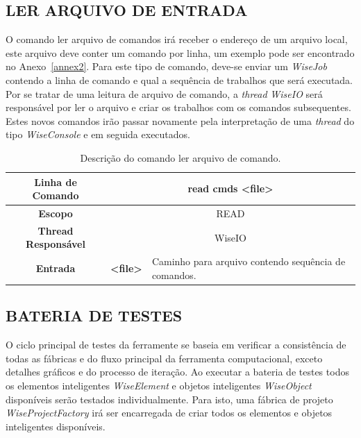 \subsection{LER ARQUIVO DE ENTRADA}\label{sec:read_cmds}


O comando ler arquivo de comandos irá receber o endereço de um arquivo local, este arquivo deve conter um comando por linha, um exemplo pode ser encontrado no Anexo~\ref{annex2}. Para este tipo de comando, deve-se enviar um \textit{WiseJob} contendo a linha de comando e qual a sequência de trabalhos que será executada. Por se tratar de uma leitura de arquivo de comando, a \textit{thread} \textit{WiseIO} será responsável por ler o arquivo e criar os trabalhos com os comandos subsequentes. Estes novos comandos irão passar novamente pela interpretação de uma \textit{thread} do tipo \textit{WiseConsole} e em seguida executados.

\begin{center}
	\begin{table}[!htbp]
		\begin{tabularx}{\textwidth}{c|c|X}
			\toprule
			\textbf{Linha de Comando} & \multicolumn{2}{c}{read cmds <file>} \\
			\midrule
			\textbf{Escopo} & \multicolumn{2}{c}{READ} \\
			\hline
			\textbf{Thread Responsável} & \multicolumn{2}{c}{WiseIO} \\
			\hline
			\textbf{Entrada} & \textbf{<file>} & Caminho para arquivo contendo sequência de comandos. \\
			\bottomrule
		\end{tabularx}
		\caption{Descrição do comando ler arquivo de comando.}
		\label{tab:read}
	\end{table}
\end{center}

\subsection{BATERIA DE TESTES}\label{sec:test}

O ciclo principal de testes da ferramente se baseia em verificar a consistência de todas as fábricas e do fluxo principal da ferramenta computacional, exceto detalhes gráficos e do processo de iteração. Ao executar a bateria de testes todos os elementos inteligentes \textit{WiseElement} e objetos inteligentes \textit{WiseObject} disponíveis serão testados individualmente. Para isto, uma fábrica de projeto \textit{WiseProjectFactory} irá ser encarregada de criar todos os elementos e objetos inteligentes disponíveis.

